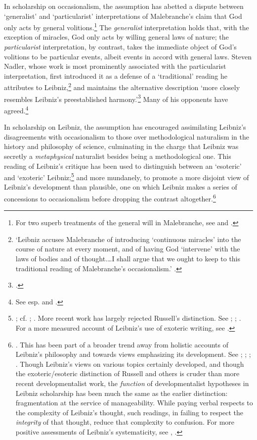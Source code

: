 \documentclass{article}
\begin{document}
In scholarship on occasionalism, the assumption has abetted a dispute between `generalist' and `particularist' interpretations of Malebranche's claim that God only acts by general volitions.\footnote{For two superb treatments of the general will in Malebranche, see \autocite{Schmaltz2008} and \autocite{Wahl2011}.} The \emph{generalist} interpretation holds that, with the exception of miracles, God only acts by willing general laws of nature; the \emph{particularist} interpretation, by contrast, takes the immediate object of God's volitions to be particular events, albeit events in accord with general laws. Steven Nadler, whose work is most prominently associated with the particularist interpretation, first introduced it as a defense of a `traditional' reading he attributes to Leibniz,\footnote{`Leibniz accuses Malebranche of introducing `continuous miracles' into the course of nature at every moment, and of having God `intervene' with the laws of bodies and of thought.\ldots I shall argue that we ought to keep to this traditional reading of Malebranche's occasionalism.' \autocite[32]{Nadler1993}.} and maintains the alternative description `more closely resembles Leibniz's preestablished harmony.'\footnote{\autocite[31]{Nadler1993}.} Many of his opponents have agreed.\footnote{See esp. \autocite{Clarke1995} and \autocite{Scott1997}.}

In scholarship on Leibniz, the assumption has encouraged assimilating Leibniz's disagreements with occasionalism to those over methodological naturalism in the history and philosophy of science, culminating in the charge that Leibniz was secretly a \emph{metaphysical} naturalist besides being a methodological one. This reading of Leibniz's critique has been used to distinguish between an `esoteric' and `exoteric'
Leibniz;\footnote{\autocite{Russell1951}; cf. \autocite{Shields1986}; \autocite[277-281]{Wilson1989}.
  More recent work has largely rejected Russell's distinction. See
  \autocite[4-9]{Mercer2001}; \autocite[420-426]{Rateau2008}; \autocite{Antognazza2009}. For a more
  measured account of Leibniz's use of exoteric writing, see \autocite{Whipple2015}.} and more mundanely, to promote a more disjoint view of
Leibniz's development than plausible, one on which Leibniz makes a
series of concessions to occasionalism before dropping the contrast
altogether.\footnote{\autocite{Scott1997}. This has been part of a broader trend
  away from holistic accounts of Leibniz's philosophy and towards views
  emphasizing its development. See \autocite[373]{Wilson1999}; \autocite[78]{Garber2008};
  \autocite[388]{Garber2009}; \autocite[223-232]{Garber2014}. Though Leibniz's views on various topics
  certainly developed, and though the exoteric/esoteric distinction of
  Russell and others is cruder than more recent developmentalist work,
  the \emph{function} of developmentalist hypotheses in Leibniz
  scholarship has been much the same as the earlier distinction:
  fragmentation at the service of manageability. While paying verbal
  respects to the complexity of Leibniz's thought, such readings, in
  failing to respect the \emph{integrity} of that thought, reduce that
  complexity to confusion. For more positive assessments of Leibniz's
  systematicity, see \autocite{Rescher1981}, \autocite{Goldenbaum2002}.}
\end{document}
